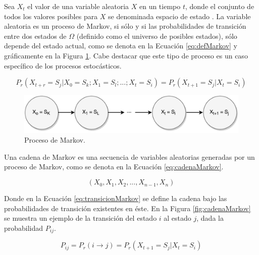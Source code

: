 Sea $X_t$ el valor de una variable aleatoria $X$ en un tiempo $t$, donde el conjunto de todos los valores posibles para $X$ se denominada espacio de estado \citep{ching2006markov}. La variable aleatoria es un proceso de Markov, si s\'olo y si las probabilidades de transici\'on entre dos estados de $\Omega$ (definido como el universo de posibles estados), s\'olo depende del estado actual, como se denota en la Ecuaci\'on \ref{eq:defMarkov} y gr\'aficamente en la Figura \ref{fig:procesoMarkov}. Cabe destacar que este tipo de proceso es un caso espec\'ifico de los procesos estoc\'asticos.

\begin{equation} \label{eq:defMarkov} 
	P_r(X_{t+r} = S_j | X_0 = S_k ; X_1 = S_l ; ... ; X_t = S_i) = P_r(X_{t+1} = S_j | X_t = S_i)
\end{equation}

\begin{figure}[ht!]
  \centering
    \includegraphics[scale=0.6]{images/ProcesoMarkov.pdf}
  \caption{Proceso de Markov.}
  \label{fig:procesoMarkov}
\end{figure}

Una cadena de Markov es una secuencia de variables aleatorias generadas por un proceso de Markov, como se denota en la Ecuaci\'on \ref{eq:cadenaMarkov}.

\begin{equation} \label{eq:cadenaMarkov}
	(X_0, X_1, X_2, ..., X_{n-1}, X_{n})
\end{equation}

\normalsize{Donde en la Ecuaci\'on} \ref{eq:transicionMarkov} \normalsize{se define la cadena bajo las probabilidades de transici\'on existentes en \'este.} En la Figura \ref{fig:cadenaMarkov} se muestra un ejemplo de la transici\'on del estado $i$ al estado $j$, dada la probabilidad $P_{ij}$.

\begin{equation} \label{eq:transicionMarkov}
	P_{ij} = P_r(i \rightarrow j) = P_r(X_{t+1} = S_j | X_t = S_i)
\end{equation}

